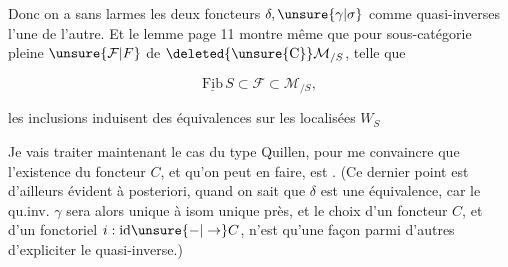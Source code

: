 
Donc on a sans larmes les deux foncteurs $\delta,\unsure{\gamma|\sigma}$ comme quasi-inverses l'une de l'autre. Et le lemme page 11 montre même que pour \uline{} sous-catégorie pleine $\unsure{\mathcal F|F}$ de $\deleted{\unsure{\mathrm{C}}}\mathcal M_{/S}$, telle que

\[
\underline{\mathrm{Fib}}\,S\subset\mathcal F\subset\mathcal M_{/S},
\]

les inclusions induisent des équivalences sur les localisées $W_S$


Je vais traiter maintenant le cas du type Quillen, pour me convaincre que l'existence du foncteur $C$, et  qu'on peut en faire, est . (Ce dernier point est d'ailleurs évident à posteriori, quand on sait que $\delta$ est une équivalence, car le qu.inv. $\gamma$ sera alors unique à isom unique près, et le choix d'un foncteur $C$, et d'un  fonctoriel $i:\mathrm{id}\unsure{-|\to}C$, n'est qu'une façon parmi d'autres d'expliciter le quasi-inverse.)
